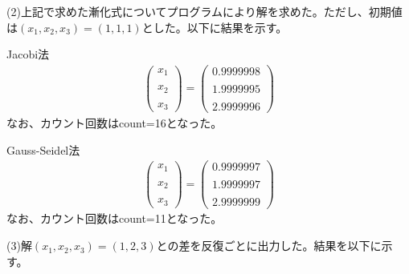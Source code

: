 \documentclass[]{jsarticle}
\begin{document}
\noindent
(2)上記で求めた漸化式についてプログラムにより解を求めた。ただし、初期値は$(x_1,x_2,x_3)=(1,1,1)$とした。以下に結果を示す。

Jacobi法
\begin{eqnarray}
\left(
\begin{array}{r}
  x_1\\\\x_2\\\\x_3
\end{array}
\right)
 = 
\left(
\begin{array}{r}
  0.9999998\\\\1.9999995\\\\2.9999996
\end{array}
\right)
\end{eqnarray}
なお、カウント回数はcount=16となった。

Gauss-Seidel法
\begin{eqnarray}
\left(
\begin{array}{r}
  x_1\\\\x_2\\\\x_3
\end{array}
\right)
 = 
\left(
\begin{array}{r}
  0.9999997\\\\1.9999997\\\\2.9999999
\end{array}
\right)
\end{eqnarray}
なお、カウント回数はcount=11となった。

\noindent
(3)解$(x_1,x_2,x_3)=(1,2,3)$との差を反復ごとに出力した。結果を以下に示す。
\end{document}
